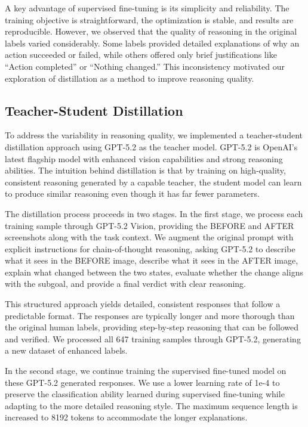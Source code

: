 \documentclass[11pt,a4paper]{article}
\begin{document}
A key advantage of supervised fine-tuning is its simplicity and reliability. The training objective is straightforward, the optimization is stable, and results are reproducible. However, we observed that the quality of reasoning in the original labels varied considerably. Some labels provided detailed explanations of why an action succeeded or failed, while others offered only brief justifications like ``Action completed'' or ``Nothing changed.'' This inconsistency motivated our exploration of distillation as a method to improve reasoning quality.

\subsection{Teacher-Student Distillation}

To address the variability in reasoning quality, we implemented a teacher-student distillation approach using GPT-5.2 as the teacher model. GPT-5.2 is OpenAI's latest flagship model with enhanced vision capabilities and strong reasoning abilities. The intuition behind distillation is that by training on high-quality, consistent reasoning generated by a capable teacher, the student model can learn to produce similar reasoning even though it has far fewer parameters.

The distillation process proceeds in two stages. In the first stage, we process each training sample through GPT-5.2 Vision, providing the BEFORE and AFTER screenshots along with the task context. We augment the original prompt with explicit instructions for chain-of-thought reasoning, asking GPT-5.2 to describe what it sees in the BEFORE image, describe what it sees in the AFTER image, explain what changed between the two states, evaluate whether the change aligns with the subgoal, and provide a final verdict with clear reasoning.

This structured approach yields detailed, consistent responses that follow a predictable format. The responses are typically longer and more thorough than the original human labels, providing step-by-step reasoning that can be followed and verified. We processed all 647 training samples through GPT-5.2, generating a new dataset of enhanced labels.

In the second stage, we continue training the supervised fine-tuned model on these GPT-5.2 generated responses. We use a lower learning rate of 1e-4 to preserve the classification ability learned during supervised fine-tuning while adapting to the more detailed reasoning style. The maximum sequence length is increased to 8192 tokens to accommodate the longer explanations.
\end{document}
